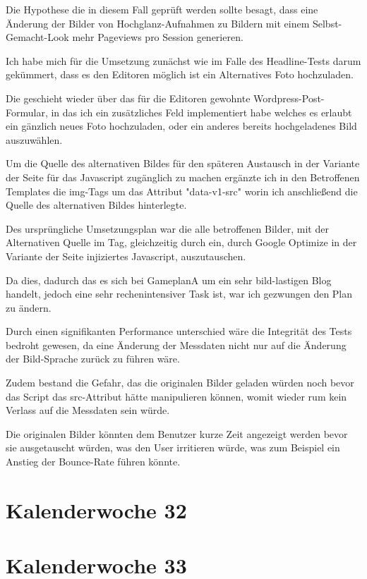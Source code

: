 \documentclass[11pt]{article} %
\begin{document}
Die Hypothese die in diesem Fall geprüft werden sollte besagt, dass eine Änderung der Bilder von Hochglanz-Aufnahmen zu Bildern mit einem Selbst-Gemacht-Look mehr Pageviews pro Session generieren.

Ich habe mich für die Umsetzung zunächst wie im Falle des Headline-Tests darum gekümmert, dass es den Editoren möglich ist ein Alternatives Foto hochzuladen.

Die geschieht wieder über das für die Editoren gewohnte Wordpress-Post-Formular, in das ich ein zusätzliches Feld implementiert habe welches es erlaubt ein gänzlich neues Foto hochzuladen, oder ein anderes bereits hochgeladenes Bild auszuwählen.

Um die Quelle des alternativen Bildes für den späteren Austausch in der Variante der Seite für das Javascript zugänglich zu machen ergänzte ich in den Betroffenen Templates die img-Tags um das Attribut "data-v1-src" worin ich anschließend die Quelle des alternativen Bildes hinterlegte.

Des ursprüngliche Umsetzungsplan war die alle betroffenen Bilder, mit der Alternativen Quelle im Tag, gleichzeitig durch ein, durch Google Optimize in der Variante der Seite injiziertes Javascript,  auszutauschen.

Da dies, dadurch das es sich bei GameplanA um ein sehr bild-lastigen Blog handelt, jedoch eine sehr rechenintensiver Task ist, war ich gezwungen den Plan zu ändern.

Durch einen signifikanten Performance unterschied wäre die Integrität des Tests bedroht gewesen, da eine Änderung der Messdaten nicht nur auf die Änderung der Bild-Sprache zurück zu führen wäre.

Zudem bestand die Gefahr, das die originalen Bilder geladen würden noch bevor das Script das src-Attribut hätte manipulieren können, womit wieder rum kein Verlass auf die Messdaten sein würde.

Die originalen Bilder könnten dem Benutzer kurze Zeit angezeigt werden bevor sie ausgetauscht würden, was den User irritieren würde, was zum Beispiel ein Anstieg der Bounce-Rate führen könnte.

\section{Kalenderwoche 32} \label{sec:kw3}



\section{Kalenderwoche 33} \label{sec:kw3}
\end{document}
